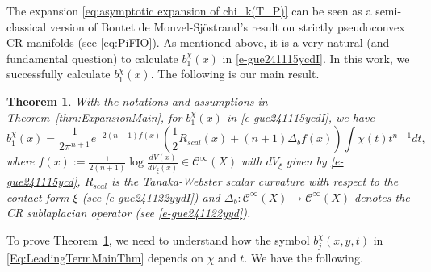 \documentclass[12pt]{amsart}
\newtheorem{theorem}{Theorem}[section]
\theoremstyle{definition}
\theoremstyle{named}
\numberwithin{equation}{subsection}
\def\cC{\mathscr{C}}
\begin{document}
The expansion \eqref{eq:asymptotic expansion of chi_k(T_P)} can be seen as a semi-classical version of Boutet de Monvel-Sj\"ostrand's result on strictly pseudoconvex CR manifolds (see \eqref{eq:PiFIO}). As mentioned above, it is a very natural (and fundamental question) to calculate $b^\chi_1(x)$ in \eqref{e-gue241115ycdI}. In this work, we successfully calculate $b^\chi_1(x)$. The following is our main result. 

\begin{theorem}\label{t-gue241115yyd}
With the notations and assumptions in Theorem~\ref{thm:ExpansionMain}, for $b^\chi_1(x)$ in \eqref{e-gue241115ycdI}, we have 
\begin{equation}\label{e-gue241115ycdb}
b^\chi_1(x)=\frac{1}{2\pi^{n+1}}e^{-2(n+1)f(x)}\left(\frac{1}{2}R_{scal}(x)+(n+1)\Delta_b f(x)\right)\int\chi(t)t^{n-1}dt,
\end{equation}
where $f(x):=\frac{1}{2(n+1)}\log \frac{dV(x)}{dV_\xi(x)}\in\cC^\infty(X)$ with \(dV_\xi\) given by \eqref{e-gue241115ycd}, $R_{scal}$ is the Tanaka-Webster scalar curvature with respect to the contact form $\xi$ (see \eqref{e-gue241122yydI}) and $\Delta_b:\cC^{\infty}(X)\rightarrow\cC^{\infty}(X)$ denotes the CR sublaplacian operator (see \eqref{e-gue241122yyd}). 
\end{theorem} 

To prove Theorem~\ref{t-gue241115yyd}, we need to understand how the symbol $b^\chi_j(x,y,t)$ in \eqref{Eq:LeadingTermMainThm} depends on \(\chi\) and $t$. We have the following.
\end{document}
